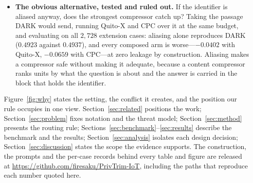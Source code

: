 \begin{itemize}
and the two are close to additive rather than substitutable.
\item \textbf{The obvious alternative, tested and ruled out.} If the identifier is aliased anyway,
does the strongest compressor catch up? Taking the passage \textsc{DARK} would send, running
Quito-X and CPC over it at the same budget, and evaluating on all $2{,}728$ extension cases:
aliasing alone reproduces \textsc{DARK} ($0.4923$ against $0.4937$), and every composed arm is
worse---$-0.0402$ with Quito-X, $-0.0659$ with CPC---at zero leakage by construction. Aliasing
makes a compressor safe
without making it adequate, because a content compressor ranks units by what the question is about
and the answer is carried in the block that holds the identifier.
\end{itemize}

Figure~\ref{fig:why} states the setting, the conflict it creates, and the position our rule
occupies in one view. Section~\ref{sec:related} positions the work; Section~\ref{sec:problem}
fixes notation and the threat model; Section~\ref{sec:method} presents the routing rule;
Sections~\ref{sec:benchmark}--\ref{sec:results} describe the benchmark and the results;
Section~\ref{sec:analysis} isolates each design decision; Section~\ref{sec:discussion}
states the scope the evidence supports. The construction, the prompts and the per-case records
behind every table and figure are released at
\url{https://github.com/firesaku/PrivTrim-IoT}, including the paths that reproduce each number
quoted here.
